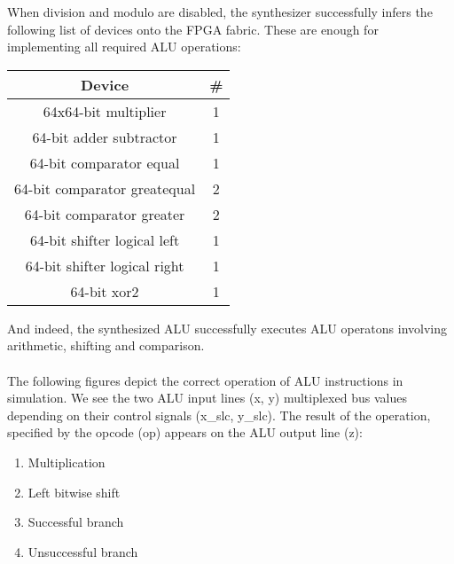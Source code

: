 \documentclass{l4proj}
\begin{document}
When division and modulo are disabled, the synthesizer successfully infers the following list of devices onto the FPGA fabric. These are enough for implementing all required ALU operations:
\begin{center}
\begin{tabular}{ |c|c| } 
 \hline
 \textbf{Device} & \textbf{\#} \\ 
 \hline
   64x64-bit multiplier & 1 \\
   64-bit adder subtractor & 1 \\
   64-bit comparator equal & 1 \\
   64-bit comparator greatequal & 2 \\
   64-bit comparator greater & 2 \\
   64-bit shifter logical left & 1 \\
   64-bit shifter logical right & 1 \\
   64-bit xor2 & 1 \\
 \hline
\end{tabular}
\end{center}
And indeed, the synthesized ALU successfully executes ALU operatons involving arithmetic, shifting and comparison.\\\\
The following figures depict the correct operation of ALU instructions in simulation. We see the two ALU input lines (x, y) multiplexed bus values depending on their control signals (x\_slc, y\_slc). The result of the operation, specified by the opcode (op) appears on the ALU output line (z):
\begin{enumerate}[label=(\alph*)]
    \item Multiplication
    \item Left bitwise shift
    \item Successful branch
    \item Unsuccessful branch
\end{enumerate}
\begin{figure}[]
  \centering
  \hfill{}
\hfill{}
  \hfill{}
\end{figure}
\end{document}
